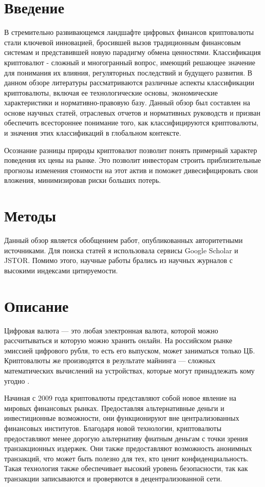 \documentclass[14pt, a4paper]{extarticle}
\begin{document}



\section*{Введение}\par
В стремительно развивающемся ландшафте цифровых финансов криптовалюты стали ключевой инновацией, бросившей вызов традиционным финансовым системам и представившей новую парадигму обмена ценностями. Классификация криптовалют - сложный и многогранный вопрос, имеющий решающее значение для понимания их влияния, регуляторных последствий и будущего развития. В данном обзоре литературы рассматриваются различные аспекты классификации криптовалюты, включая ее технологические основы, экономические характеристики и нормативно-правовую базу. Данный обзор был составлен на основе научных статей, отраслевых отчетов и нормативных руководств и призван обеспечить всестороннее понимание того, как классифицируются криптовалюты, и значения этих классификаций в глобальном контексте.

Осознание разницы природы криптовалют позволит понять примерный характер поведения их цены на рынке. Это позволит инвесторам строить приблизительные прогнозы изменения стоимости на этот актив и поможет дивесифицировать свои вложения, минимизировав риски больших потерь.

\section*{Методы}\par
Данный обзор является обобщением работ, опубликованных авторитетными источниками. Для поиска статей я использовала сервисы Google Scholar и JSTOR. Помимо этого, научные работы брались из научных журналов с высокими индексами цитируемости. 


\section*{Описание}\par
Цифровая валюта — это любая электронная валюта, которой можно рассчитываться и которую можно хранить онлайн. На российском рынке эмиссией цифрового рубля, то есть его выпуском, может заниматься только ЦБ. Криптовалюты же производятся в результате майнинга — сложных математических вычислений на устройствах, которые могут принадлежать кому угодно \cite{коречков2016экономическая}.

Начиная с 2009 года криптовалюты представляют собой новое явление на мировых финансовых рынках. Предоставляя альтернативные деньги и инвестиционные возможности, они функционируют вне централизованных финансовых институтов. Благодаря новой технологии, криптовалюты предоставляют менее дорогую альтернативу фиатным деньгам с точки зрения транзакционных издержек. Они также предоставляют возможность анонимных транзакций, что может быть полезно для тех, кто ценит конфиденциальность. Такая технология также обеспечивает высокий уровень безопасности, так как транзакции записываются и проверяются в децентрализованной сети.
\end{document}

